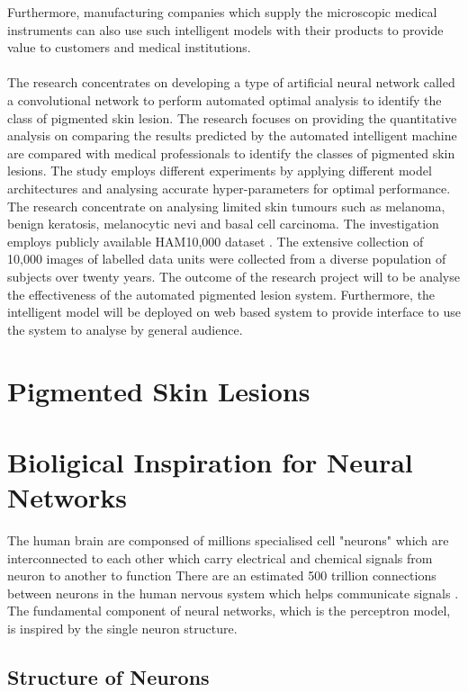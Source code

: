 Furthermore, manufacturing companies which supply the microscopic medical instruments can also use such intelligent models with their products to provide value to customers and medical institutions.

\paragraph{}The research concentrates on developing a type of artificial neural network called a convolutional network to perform automated optimal analysis to identify the class of pigmented skin lesion. 
The research focuses on providing the quantitative analysis on comparing the results predicted by the automated intelligent machine are compared with medical professionals to identify the classes of pigmented skin lesions. The study employs different experiments by applying different model architectures and analysing accurate hyper-parameters for optimal performance. 
The research concentrate on analysing limited skin tumours such as melanoma, benign keratosis, melanocytic nevi 
and basal cell carcinoma. The investigation employs publicly available HAM10,000 dataset \citep*{DVN/DBW86T_2018}. 
The extensive collection of 10,000 images of labelled data units were collected from a diverse population of subjects over twenty years.
The outcome of the research project will to be analyse the effectiveness of the automated pigmented 
lesion system. Furthermore, the intelligent model will be deployed on web based system to provide 
interface to use the system to analyse by general audience.
\pagebreak

\section{Pigmented Skin Lesions}

\pagebreak
\pagebreak
\section{Bioligical Inspiration for Neural Networks}
The human brain are componsed of millions specialised cell "neurons" which are interconnected to each other which carry electrical and chemical signals from neuron to another to function
There are an estimated 500 trillion connections between neurons in the human nervous system which helps communicate signals \citep*{patterson2017deep}.
The fundamental component of neural networks, which is the perceptron model, is inspired by the single neuron structure.
\subsection{Structure of Neurons}

